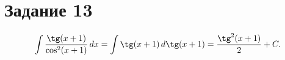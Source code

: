 \section{Задание 13}

\[ \int \frac{\tg(x+1)}{\cos^2 (x+1)} \, dx = \int \tg (x+1) \, d \tg (x+1) =
\frac{\tg^2(x+1)}{2} + C. \]
